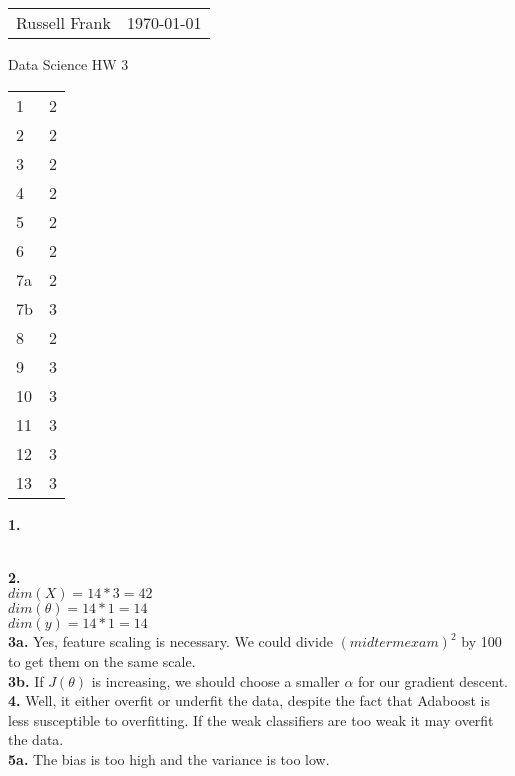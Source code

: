 \documentclass[10pt]{amsart}
\makeatletter
\newcommand{\head}[1]{
   \begin{tabular*}{7.1in}{@{}l@{\extracolsep{\fill}}r}
      Russell Frank & \today \\
   \end{tabular*}
   \begin{center} \LARGE #1 \normalsize \end{center}
   \vskip 0.1in
}
\makeatother
\begin{document}
\head{Data Science HW 3}

\begin{center}

\begin{tabular}{l|l}

  1 & 2 \\
  2 & 2  \\
  3 & 2  \\
  4 & 2  \\
  5 & 2  \\
  6 & 2  \\
  7a & 2  \\
  7b & 3  \\
  8 & 2  \\
  9 & 3  \\
  10 & 3  \\
  11 & 3  \\
  12 & 3  \\
  13 & 3  \\

\end{tabular}

\end{center}

\newpage

\textbf{1.}

 \\

\textbf{2.} \\

$dim(X) = 14 * 3 = 42$ \\
$dim(\theta) = 14 * 1 = 14$ \\
$dim(y) = 14 * 1 = 14$\\

\textbf{3a.}
Yes, feature scaling is necessary. We could divide $(midterm exam)^2$ by 100 to
get them on the same scale.\\

\textbf{3b.}
If $J(\theta)$ is increasing, we should choose a smaller $\alpha$ for our
gradient descent. \\

\textbf{4.} Well, it either overfit or underfit the data, despite the fact
that Adaboost is less susceptible to overfitting. If the weak classifiers
are too weak it may overfit the data. \\

\textbf{5a.} The bias is too high and the variance is too low. \\
\end{document}
